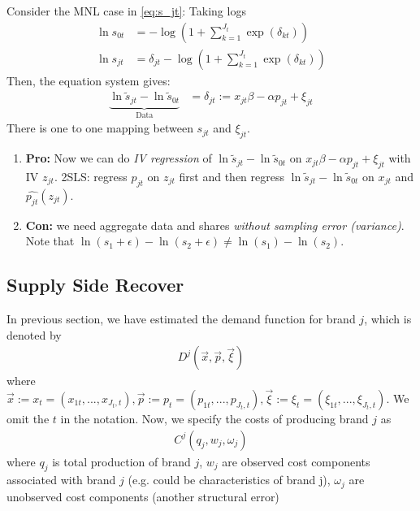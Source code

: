 \documentclass[11pt]{elegantbook}
\begin{document}
\begin{example}
    Consider the MNL case in \eqref{eq:s_jt}:
    Taking logs
    \begin{equation}
        \begin{aligned}
            \ln s_{0t}&=-\log\left(1+\sum_{k=1}^{J_t}\exp(\delta_{kt})\right)\\
            \ln s_{jt}&=\delta_{jt}-\log\left(1+\sum_{k=1}^{J_t}\exp(\delta_{kt})\right)
        \end{aligned}
        \nonumber
    \end{equation}
    Then, the equation system gives:
    \begin{equation}
        \begin{aligned}
            \underbrace{\ln \tilde{s}_{jt}-\ln \tilde{s}_{0t}}_\text{Data}&=\delta_{jt}:= x_{jt}\beta-\alpha p_{jt}+\xi_{jt}
        \end{aligned}
        \nonumber
    \end{equation}
    There is one to one mapping between $s_{jt}$ and $\xi_{jt}$.
    \begin{enumerate}
        \item \textbf{Pro:} Now we can do \textit{IV regression} of $\ln \tilde{s}_{jt}-\ln \tilde{s}_{0t}$ on $x_{jt}\beta-\alpha p_{jt}+\xi_{jt}$ with IV $z_{jt}$. 2SLS: regress $p_{jt}$ on $z_{jt}$ first and then regress $\ln \tilde{s}_{jt}-\ln \tilde{s}_{0t}$ on $x_{jt}$ and $\hat{p_{jt}}(z_{jt})$.
        \item \textbf{Con:} we need aggregate data and shares \textit{without sampling error (variance)}. Note that $\ln(s_1+\epsilon)-\ln(s_2+\epsilon)\neq \ln(s_1)-\ln(s_2)$.
    \end{enumerate}
\end{example}

\subsection{Supply Side Recover}
In previous section, we have estimated the demand function for brand $j$, which is denoted by
\begin{equation}
    \begin{aligned}
        D^j\left(\vec{x},\vec{p},\vec{\xi}\right)
    \end{aligned}
    \nonumber
\end{equation}
where $\vec{x}:=x_t=(x_{1t},...,x_{J_t,t}), \vec{p}:=p_t=(p_{1t},...,p_{J_t,t}), \vec{\xi}:=\xi_t=(\xi_{1t},..., \xi_{J_t,t})$. We omit the $t$ in the notation. Now, we specify the costs of producing brand $j$ as
\begin{equation}
    \begin{aligned}
        C^j\left(q_j,w_j,\omega_j\right)
    \end{aligned}
    \nonumber
\end{equation}
where $q_j$ is total production of brand $j$, $w_j$ are observed cost components associated with brand $j$ (e.g. could be characteristics of brand j), $\omega_j$ are unobserved cost components (another structural error)
\end{document}

